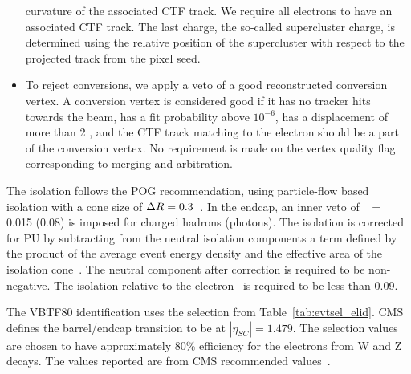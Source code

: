 \begin{itemize}
curvature of the associated CTF track. We require all electrons to have an
associated CTF track. The last charge, the so-called supercluster charge, is
determined using the relative position of the supercluster with respect to the
projected track from the pixel seed.
\item To reject conversions, we apply a veto of a good reconstructed conversion
vertex. A conversion vertex is considered good if it has no tracker hits
towards the beam, has a fit probability above $10^{-6}$, has a displacement of
more than 2 \cm, and the CTF track matching to the electron should be a part
of the conversion vertex. No requirement is made on the vertex quality flag
corresponding to merging and arbitration.
\end{itemize}
The isolation follows the POG recommendation, using particle-flow based
isolation with a cone size of $\Delta R = 0.3$~\cite{egammapfisotwiki}. In the
endcap, an inner veto of \DR\ $=$ 0.015 (0.08) is imposed for charged hadrons
(photons). The isolation is corrected for PU by subtracting from the neutral
isolation components a term defined by the product of the average event energy
density and the effective area of the isolation cone~\cite{egammaisorhoaeff}.
The neutral component after correction is required to be non-negative. The
isolation relative to the electron \pt\ is required to be less than 0.09.

The VBTF80 identification uses the selection from Table~\ref{tab:evtsel_elid}.
CMS defines the barrel/endcap transition to be at $|\eta_{SC}| = 1.479$.
The selection values are chosen to have approximately 80\% efficiency for
the electrons from W and Z decays. The values reported are from CMS
recommended values~\cite{egammaidtwiki}.

